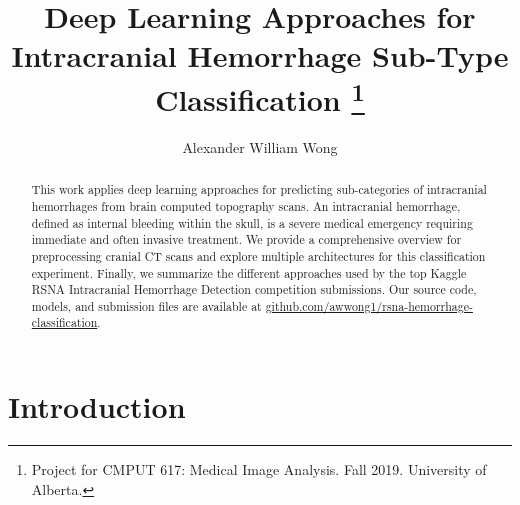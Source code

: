 \documentclass[runningheads]{llncs}
\begin{document}

\title{Deep Learning Approaches for Intracranial Hemorrhage Sub-Type Classification
\thanks{Project for CMPUT 617: Medical Image Analysis. Fall 2019. University of Alberta.}}
%
%
\author{Alexander William Wong}
%

%
%
\maketitle %
\begin{abstract}
This work applies deep learning approaches for predicting sub-categories of intracranial hemorrhages from brain computed topography scans.
An intracranial hemorrhage, defined as internal bleeding within the skull, is a severe medical emergency requiring immediate and often invasive treatment.
We provide a comprehensive overview for preprocessing cranial CT scans and explore multiple architectures for this classification experiment.
Finally, we summarize the different approaches used by the top Kaggle RSNA Intracranial Hemorrhage Detection competition submissions.
Our source code, models, and submission files are available at \href{https://github.com/awwong1/rsna-hemorrhage-classification}{github.com/awwong1/rsna-hemorrhage-classification}.

\end{abstract}
%
%
%
\section{Introduction}
\end{document}
